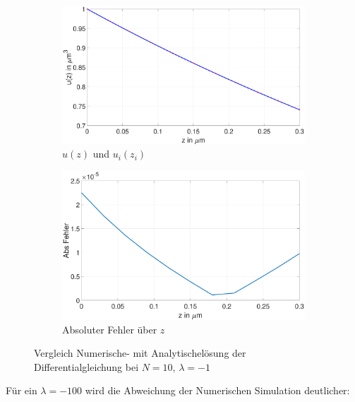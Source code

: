  \begin{figure}[p]
 	\begin{subfigure}[b]{0.5\textwidth}
 		\includegraphics[width=\textwidth]{figures/station_gl_2_1/test_n10}
 		\caption{$u(z)$ und $u_{i}(z_i)$}
 	\end{subfigure}
 	\hfill
 	\begin{subfigure}[b]{0.5\textwidth}
 		\includegraphics[width=1\linewidth]{figures/station_gl_2_1/test_n10_fehler}
 		\caption{Absoluter Fehler über $z$}
 	\end{subfigure}
 	\caption{Vergleich  Numerische- mit Analytischelösung der Differentialgleichung bei $N=10,\,\lambda=-1$}
 \end{figure}
\clearpage
 Für ein $\lambda=-100$ wird die Abweichung der Numerischen Simulation deutlicher:
  
